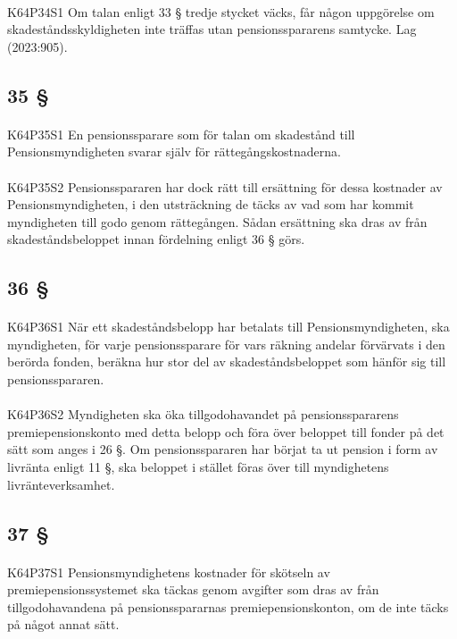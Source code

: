 \documentclass[a4paper,notitlepage,openany,10pt]{book}
\begin{document}
\paragraph*{}
{\tiny K64P34S1}
Om talan enligt 33 § tredje stycket väcks, får någon uppgörelse om skadeståndsskyldigheten inte träffas utan pensionsspararens samtycke.
Lag (2023:905).
\subsection*{35 §}
\paragraph*{}
{\tiny K64P35S1}
En pensionssparare som för talan om skadestånd till Pensionsmyndigheten svarar själv för rättegångskostnaderna.
\paragraph*{}
{\tiny K64P35S2}
Pensionsspararen har dock rätt till ersättning för dessa kostnader av Pensionsmyndigheten, i den utsträckning de täcks av vad som har kommit myndigheten till godo genom rättegången. Sådan ersättning ska dras av från skadeståndsbeloppet innan fördelning enligt 36 § görs.
\subsection*{36 §}
\paragraph*{}
{\tiny K64P36S1}
När ett skadeståndsbelopp har betalats till Pensionsmyndigheten, ska myndigheten, för varje pensionssparare för vars räkning andelar förvärvats i den berörda fonden, beräkna hur stor del av skadeståndsbeloppet som hänför sig till pensionsspararen.
\paragraph*{}
{\tiny K64P36S2}
Myndigheten ska öka tillgodohavandet på pensionsspararens premiepensionskonto med detta belopp och föra över beloppet till fonder på det sätt som anges i 26 §. Om pensionsspararen har börjat ta ut pension i form av livränta enligt 11 §, ska beloppet i stället föras över till myndighetens livränteverksamhet.
\subsection*{37 §}
\paragraph*{}
{\tiny K64P37S1}
Pensionsmyndighetens kostnader för skötseln av premiepensionssystemet ska täckas genom avgifter som dras av från tillgodohavandena på pensionsspararnas premiepensionskonton, om de inte täcks på något annat sätt.
\end{document}
